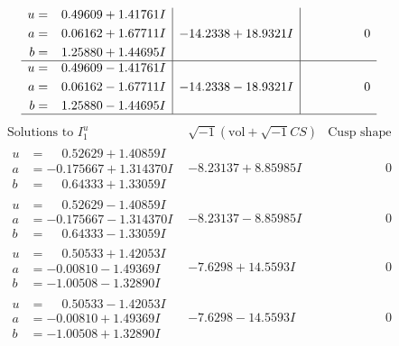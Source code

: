 \documentclass[1p]{elsarticle_modified}
\theoremstyle{definition}
\newcommand{\I}{\sqrt{-1}}
\begin{document}
$$\begin{array}{c|c|c}
\begin{aligned}
u &= \phantom{-}0.49609 + 1.41761 I \\
a &= \phantom{-}0.06162 + 1.67711 I \\
b &= \phantom{-}1.25880 + 1.44695 I\end{aligned}
 & -14.2338 + 18.9321 I & \phantom{-0.000000 } 0 \\ \hline\begin{aligned}
u &= \phantom{-}0.49609 - 1.41761 I \\
a &= \phantom{-}0.06162 - 1.67711 I \\
b &= \phantom{-}1.25880 - 1.44695 I\end{aligned}
 & -14.2338 - 18.9321 I & \phantom{-0.000000 } 0\\
 \hline 
 \end{array}$$\newpage$$\begin{array}{c|c|c}  
\text{Solutions to }I^u_{1}& \I (\text{vol} + \sqrt{-1}CS) & \text{Cusp shape}\\
 \hline 
\begin{aligned}
u &= \phantom{-}0.52629 + 1.40859 I \\
a &= -0.175667 + 1.314370 I \\
b &= \phantom{-}0.64333 + 1.33059 I\end{aligned}
 & -8.23137 + 8.85985 I & \phantom{-0.000000 } 0 \\ \hline\begin{aligned}
u &= \phantom{-}0.52629 - 1.40859 I \\
a &= -0.175667 - 1.314370 I \\
b &= \phantom{-}0.64333 - 1.33059 I\end{aligned}
 & -8.23137 - 8.85985 I & \phantom{-0.000000 } 0 \\ \hline\begin{aligned}
u &= \phantom{-}0.50533 + 1.42053 I \\
a &= -0.00810 - 1.49369 I \\
b &= -1.00508 - 1.32890 I\end{aligned}
 & -7.6298 + 14.5593 I & \phantom{-0.000000 } 0 \\ \hline\begin{aligned}
u &= \phantom{-}0.50533 - 1.42053 I \\
a &= -0.00810 + 1.49369 I \\
b &= -1.00508 + 1.32890 I\end{aligned}
 & -7.6298 - 14.5593 I & \phantom{-0.000000 } 0 \\ \hline\begin{aligned}

\end{aligned}
\end{array}$$
\end{document}
